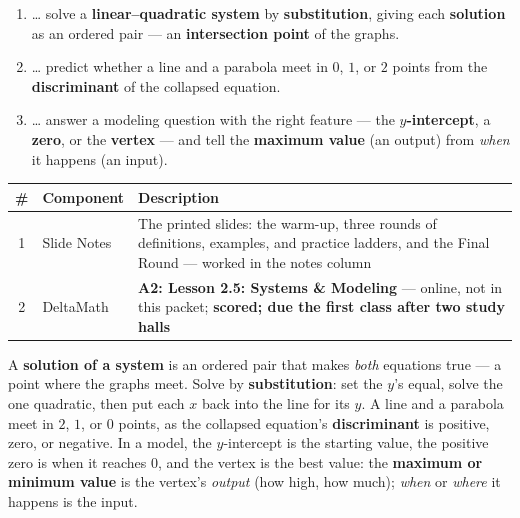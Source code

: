 \documentclass[12pt]{article}
\begin{document}

\namedateperiod
\vspace{0.18in}

\boxguard[14]
\begin{learningtargetbox}
\small
\begin{enumerate}[leftmargin=1.5em, itemsep=5pt]
  \item \ldots{} solve a \textbf{linear--quadratic system} by \textbf{substitution}, giving each
        \textbf{solution} as an ordered pair --- an \textbf{intersection point} of the graphs.
  \item \ldots{} predict whether a line and a parabola meet in $0$, $1$, or $2$ points from the
        \textbf{discriminant} of the collapsed equation.
  \item \ldots{} answer a modeling question with the right feature --- the
        \textbf{$y$-intercept}, a \textbf{zero}, or the \textbf{vertex} --- and tell the
        \textbf{maximum value} (an output) from \emph{when} it happens (an input).
\end{enumerate}
\end{learningtargetbox}

\vspace{0.14in}

\boxguard[14]
\begin{tocbox}
\small
\renewcommand{\arraystretch}{1.5}
\begin{tabularx}{\linewidth}{@{} c l X @{}}
\rowcolor{forestbg}
\textbf{\#} & \textbf{Component} & \textbf{Description} \\
\midrule
1 & Slide Notes & The printed slides: the warm-up, three rounds of definitions, examples, and
                  practice ladders, and the Final Round --- worked in the notes column \\
2 & DeltaMath   & \textbf{A2: Lesson 2.5: Systems \& Modeling} --- online, not in this packet;
                  \textbf{scored; due the first class after two study halls} \\
\end{tabularx}
\end{tocbox}

\vspace{0.14in}

\boxguard[8]
\begin{remindbox}
\small
A \textbf{solution of a system} is an ordered pair that makes \emph{both} equations true --- a
point where the graphs meet. Solve by \textbf{substitution}: set the $y$'s equal, solve the one
quadratic, then put each $x$ back into the line for its $y$. A line and a parabola meet in $2$,
$1$, or $0$ points, as the collapsed equation's \textbf{discriminant} is positive, zero, or
negative. In a model, the $y$-intercept is the starting value, the positive zero is when it
reaches $0$, and the vertex is the best value: the \textbf{maximum or minimum value} is the
vertex's \emph{output} (how high, how much); \emph{when} or \emph{where} it happens is the input.
\end{remindbox}
\end{document}
